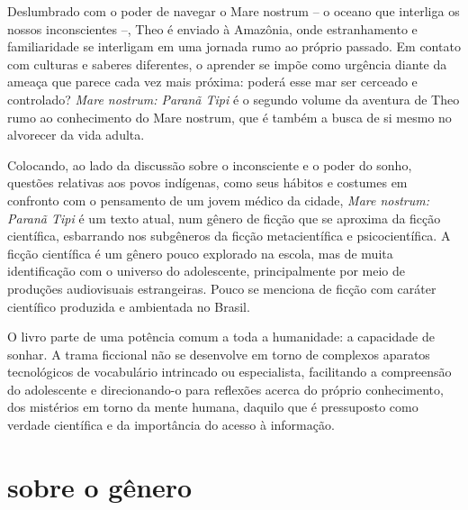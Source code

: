 Deslumbrado com o poder de navegar o Mare nostrum -- o oceano que interliga os nossos inconscientes --, Theo é enviado à Amazônia, onde estranhamento e familiaridade se interligam em uma jornada rumo ao próprio passado. Em contato com culturas e saberes diferentes, o aprender se impõe como urgência diante da ameaça que parece cada vez mais próxima: poderá esse mar ser cerceado e controlado? \textit{Mare nostrum: Paranã Tipi} é o segundo volume da aventura de Theo rumo ao conhecimento do Mare nostrum, que é também a busca de si mesmo no alvorecer da vida adulta.

Colocando, ao lado da discussão sobre o inconsciente e o poder do sonho, questões relativas aos povos indígenas, como seus hábitos e costumes em confronto com o pensamento de um jovem médico da cidade, \emph{Mare nostrum: Paranã Tipi} é um texto atual, num gênero de ficção que se aproxima da ficção científica, esbarrando nos subgêneros da ficção metacientífica e psicocientífica. A ficção científica é um gênero pouco explorado na escola, mas de muita identificação com o universo do adolescente, principalmente por meio de produções audiovisuais estrangeiras. Pouco se menciona de ficção com caráter científico produzida e ambientada no Brasil.

O livro parte de uma potência comum a toda a humanidade: a capacidade de sonhar. A trama ficcional não se desenvolve em torno de complexos aparatos tecnológicos de vocabulário intrincado ou especialista, facilitando a compreensão do adolescente e direcionando-o para reflexões acerca do próprio conhecimento, dos mistérios em torno da mente humana, daquilo que é pressuposto como verdade científica e da importância do acesso à informação. 



\section{sobre o gênero}

